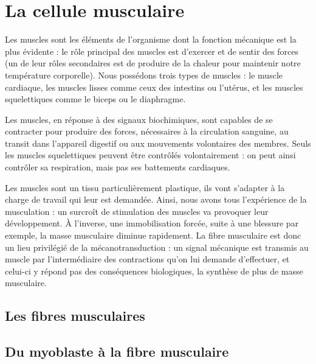  \chapter{La cellule musculaire}
 
 Les muscles sont les éléments de l'organisme dont la fonction mécanique est la plus évidente : le rôle principal des muscles est d'exercer et de sentir des forces (un de leur rôles secondaires est de produire de la chaleur pour maintenir notre température corporelle). 
 Nous possédons trois types de muscles : le muscle cardiaque, les muscles lisses comme ceux des intestins ou l'utérus, et les muscles squelettiques comme le biceps ou le diaphragme.
 
 Les muscles, en réponse à des signaux biochimiques, sont capables de se contracter pour produire des forces, nécessaires à la circulation sanguine, au transit dans l'appareil digestif ou aux mouvements volontaires des membres. Seuls les muscles squelettiques peuvent être contrôlés volontairement : on peut ainsi contrôler sa respiration, mais pas ses battements cardiaques. 
 
 
 Les muscles sont un tissu particulièrement plastique, ils vont s'adapter à la charge de travail qui leur est demandée. 
 Ainsi, nous avons tous l'expérience de la musculation : un surcroît de stimulation des muscles va provoquer leur développement. À l'inverse, une immobilisation forcée, suite à une blessure par exemple, la masse musculaire diminue rapidement. 
 La fibre musculaire est donc un lieu privilégié de la mécanotransduction : un signal mécanique est transmis au muscle par l'intermédiaire des contractions qu'on lui demande d'effectuer, et celui-ci y répond pas des conséquences biologiques, la synthèse de plus de masse musculaire. 
 

 
 
\section{Les fibres musculaires}


 \section{Du myoblaste à la fibre musculaire}
 
